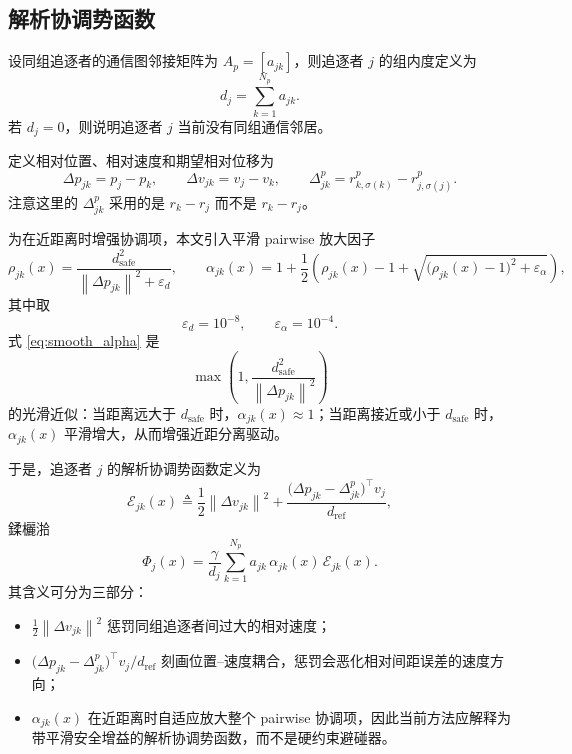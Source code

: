 \documentclass[11pt,a4paper]{article}
\newcommand{\norm}[1]{\left\lVert #1 \right\rVert}
\begin{document}
\subsection{解析协调势函数}

设同组追逐者的通信图邻接矩阵为 $A_p=[a_{jk}]$，则追逐者 $j$ 的组内度定义为
\begin{equation}
d_j=\sum_{k=1}^{N_p} a_{jk}.
\end{equation}
若 $d_j=0$，则说明追逐者 $j$ 当前没有同组通信邻居。

定义相对位置、相对速度和期望相对位移为
\begin{equation}
\Delta p_{jk}=p_j-p_k,
\qquad
\Delta v_{jk}=v_j-v_k,
\qquad
\Delta_{jk}^{p}=r_{k,\sigma(k)}^{p}-r_{j,\sigma(j)}^{p}.
\label{eq:relative_defs}
\end{equation}
注意这里的 $\Delta_{jk}^{p}$ 采用的是
\(
r_k-r_j
\)
而不是
\(
r_k-r_j
\)。

为在近距离时增强协调项，本文引入平滑 pairwise 放大因子
\begin{equation}
\rho_{jk}(x)=\frac{d_{\mathrm{safe}}^2}{\norm{\Delta p_{jk}}^2+\varepsilon_d},
\qquad
\alpha_{jk}(x)=
1+\frac{1}{2}\left(
\rho_{jk}(x)-1+\sqrt{\big(\rho_{jk}(x)-1\big)^2+\varepsilon_\alpha}
\right),
\label{eq:smooth_alpha}
\end{equation}
其中取
\begin{equation}
\varepsilon_d=10^{-8},
\qquad
\varepsilon_\alpha=10^{-4}.
\end{equation}
式 \eqref{eq:smooth_alpha} 是
\[
\max\!\left(1,\frac{d_{\mathrm{safe}}^2}{\norm{\Delta p_{jk}}^2}\right)
\]
的光滑近似：当距离远大于 $d_{\mathrm{safe}}$ 时，$\alpha_{jk}(x)\approx 1$；当距离接近或小于 $d_{\mathrm{safe}}$ 时，$\alpha_{jk}(x)$ 平滑增大，从而增强近距分离驱动。

于是，追逐者 $j$ 的解析协调势函数定义为
\begin{equation}
\mathcal E_{jk}(x)
\triangleq
\frac{1}{2}\norm{\Delta v_{jk}}^2
+
\frac{\big(\Delta p_{jk}-\Delta_{jk}^{p}\big)^\top v_j}{d_{\mathrm{ref}}},
\label{eq:pair_energy}
\end{equation}
鍒欐湁
\begin{equation}
\Phi_j(x)=
\frac{\gamma}{d_j}
\sum_{k=1}^{N_p}
a_{jk}\,\alpha_{jk}(x)\,\mathcal E_{jk}(x).
\label{eq:phi_j}
\end{equation}
其含义可分为三部分：
\begin{itemize}
\item $\frac{1}{2}\norm{\Delta v_{jk}}^2$ 惩罚同组追逐者间过大的相对速度；
\item $\big(\Delta p_{jk}-\Delta_{jk}^{p}\big)^\top v_j/d_{\mathrm{ref}}$ 刻画位置--速度耦合，惩罚会恶化相对间距误差的速度方向；
\item $\alpha_{jk}(x)$ 在近距离时自适应放大整个 pairwise 协调项，因此当前方法应解释为带平滑安全增益的解析协调势函数，而不是硬约束避碰器。
\end{itemize}
\end{document}
